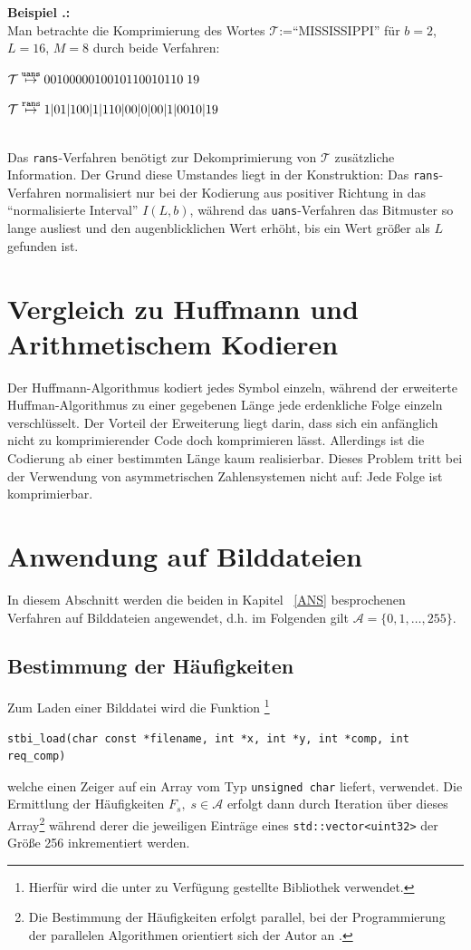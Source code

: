 \documentclass[a4paper,12pt]{article}
\newcommand{\A}{\mathcal A}
\newcounter{Beispiel}
\newcounter{Algorithmus}
\newenvironment{Beispiel}{
\medskip
        
        \setlength{\parindent}{0pt}
        \addtocounter{Beispiel}{1}
        \textbf{\textsf{Beispiel \thesubsection.\theBeispiel}:}\\}{
        \nopagebreak
        \vspace{-1.0ex}
        \bigskip
        
}
\begin{document}
\begin{Beispiel}
Man betrachte die Komprimierung des Wortes $\mathcal{T}$:="`MISSISSIPPI"'  für $b=2$, $L=16$, $M=8$ durch beide Verfahren:
\par
\vspace{0.5cm}
\begin{minipage}[h]{.5\textwidth}
$\mathcal{T}\stackrel{{\tt{uans}}}{\mapsto} 0010000010010110010110\;19$
\end{minipage}
\hfill
 \begin{minipage}[h]{.5\textwidth}
$\mathcal{T}\stackrel{{\tt{rans}}}{\mapsto} 1|01|100|1|110|00|0|00|1|0010|19$
\end{minipage}   
\vspace{0.5cm}
\\
Das {\tt{rans}}-Verfahren benötigt zur Dekomprimierung von $\mathcal{T}$ zusätzliche Information. Der Grund diese Umstandes liegt in der Konstruktion: Das {\tt{rans}}-Verfahren normalisiert nur bei der Kodierung aus positiver Richtung in das "`normalisierte Interval"' $I(L,b)$, während das {\tt{uans}}-Verfahren das Bitmuster so lange ausliest und den augenblicklichen Wert erhöht, bis ein Wert größer als $L$ gefunden ist.
\end{Beispiel}

\section{Vergleich zu Huffmann und Arithmetischem Kodieren}
Der Huffmann-Algorithmus kodiert jedes Symbol einzeln, während der erweiterte Huffman-Algorithmus zu einer gegebenen Länge jede erdenkliche Folge einzeln verschlüsselt. Der Vorteil der Erweiterung liegt darin, dass sich ein anfänglich nicht zu komprimierender Code doch komprimieren lässt. Allerdings ist die Codierung ab einer bestimmten Länge kaum realisierbar. Dieses Problem tritt bei der Verwendung von asymmetrischen Zahlensystemen nicht auf: Jede Folge ist komprimierbar.

\newpage
\section{Anwendung auf Bilddateien}
In diesem Abschnitt werden die beiden in Kapitel ~\ref{ANS} besprochenen Verfahren auf Bilddateien angewendet, d.h. im Folgenden gilt $\A=\{0,1,\ldots,255\}$.  
\subsection{Bestimmung der Häufigkeiten}
Zum Laden einer Bilddatei wird die Funktion \footnote{Hierfür wird die unter \cite{Barret} zu Verfügung gestellte Bibliothek verwendet.} 
\begin{verbatim}
stbi_load(char const *filename, int *x, int *y, int *comp, int req_comp)
\end{verbatim}
 welche einen Zeiger auf ein Array vom Typ {\tt{unsigned char}} liefert, verwendet.
Die Ermittlung der Häufigkeiten $F_{s},\;s\in\A$  erfolgt dann durch Iteration über dieses Array\footnote{Die Bestimmung der Häufigkeiten erfolgt parallel, bei der Programmierung der parallelen Algorithmen orientiert sich der Autor an \cite{Williams}.} während derer die jeweiligen Einträge eines {\tt{std::vector<uint32>}} der Größe 256 inkrementiert werden.
\end{document}
